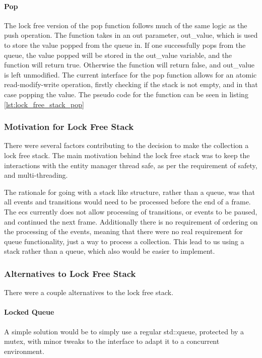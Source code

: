 \paragraph{Pop}
The lock free version of the pop function follows much of the same logic as the push operation.
The function takes in an out parameter, out\_value, which is used to store the value popped from the queue
in.
If one successfully pops from the queue, the value popped will be stored in the out\_value variable,
and the function will return true. Otherwise the function will return false, and out\_value is left
unmodified.
The current interface for the pop function allows for an atomic read-modify-write operation,
firstly checking if the stack is not empty, and in that case popping the value.
The pseudo code for the function can be seen in listing \ref{lst:lock_free_stack_pop}


\subsubsection{Motivation for Lock Free Stack}
There were several factors contributing to the decision to make the collection a lock free stack.
The main motivation behind the lock free stack was to keep the interactions with the entity manager thread safe,
as per the requirement of safety, and multi-threading.

The rationale for going with a stack like structure, rather than a queue, was that all events and transitions
would need to be processed before the end of a frame. The ecs currently does not allow processing of transitions,
or events to be paused, and continued the next frame. Additionally there is no requirement of ordering on the
processing of the events, meaning that there were no real requirement for queue functionality, just a way
to process a collection. This lead to us using a stack rather than a queue, which also would be easier to implement.

\subsubsection{Alternatives to Lock Free Stack}
There were a couple alternatives to the lock free stack.

\paragraph{Locked Queue}
A simple solution would be to simply use a regular std::queue, protected by a mutex,
with minor tweaks to the interface to adapt it to a concurrent environment.

